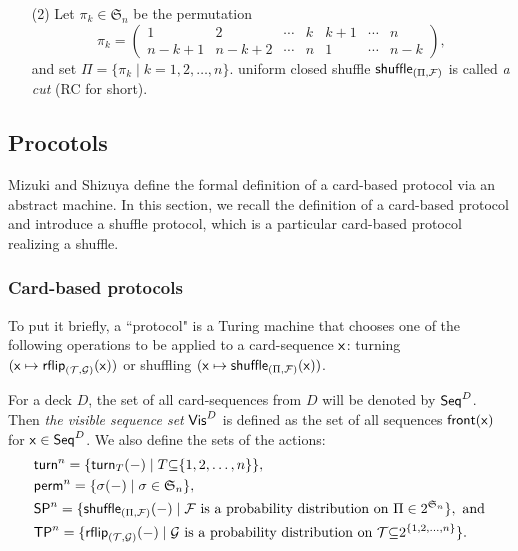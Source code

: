 \begin{example}
\begin{enumerate}
\item[(2)] Let $\pi_k\in\mathfrak{S}_n$ be the permutation
\[\pi_k=\begin{pmatrix}
1 & 2 & \cdots &  k & k+1 & \cdots & n \\
n-k+1 & n-k+2 & \cdots & n & 1 & \cdots & n-k
\end{pmatrix},\]
and set $\Pi=\{\pi_k\mid k=1,2,\ldots,n\}$.  uniform closed shuffle $\mathsf{shuffle}_{(\Pi,\mathcal{F})}$ is called \textit{a  cut} (RC for short). 
\end{enumerate}
\end{example}



\subsection{Procotols}\label{ss:protocol}
Mizuki and Shizuya \cite{MizukiIJISEC14} define the formal definition of a card-based protocol via an abstract machine.
In this section, we recall the definition of a card-based protocol and introduce a shuffle protocol, which is a particular card-based protocol realizing a shuffle. 

\subsubsection{Card-based protocols}\label{sss:reduction}

To put it briefly, a ``protocol" is a Turing machine that chooses one of the following operations to be applied to a card-sequence $\mathsf{x}$: turning $(\mathsf{x}\mapsto \mathsf{rflip}_{(\mathcal{T},\mathcal{G})}(\mathsf{x}))$ or shuffling $(\mathsf{x}\mapsto \mathsf{shuffle}_{(\Pi,\mathcal{F})}(\mathsf{x}))$.

For a deck $D$, the set of all card-sequences from $D$ will be denoted by $\mathsf{Seq}^D$.
Then \textit{the visible sequence set} $\mathsf{Vis}^D$ is defined as the set of all sequences $\mathsf{front(x)}$ for $\mathsf{x}\in \mathsf{Seq}^D$.
We also define the sets of the actions:
\begin{align*}
& \mathsf{turn}^n=\{\mathsf{turn}_T(-)\mid T\textcolor{black}{\subseteq} \{1,2,\ldots, n\}\}, \\
& \mathsf{perm}^n=\{\sigma(-)\mid \sigma\in\mathfrak{S}_n\}, \\
& \mathsf{SP}^n=\{\mathsf{shuffle}_{(\Pi,\mathcal{F})}(-)\mid \text{$\mathcal{F}$ is  a probability distribution on $\Pi\in 2^{\mathfrak{S}_n}\}, \text{ and}$}\\
& \mathsf{TP}^n=\{\mathsf{rflip}_{(\mathcal{T},\mathcal{G})}(-)\mid \text{$\mathcal{G}$ is a probability distribution on $\mathcal{T}\textcolor{black}{\subseteq} 2^{\{1,2,\ldots, n\}}\}$}.
\end{align*}

